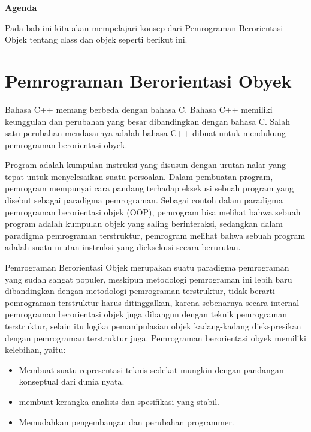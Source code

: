 \textbf{Agenda}

Pada bab ini kita akan mempelajari konsep dari Pemrograman Berorientasi Objek
tentang class dan objek seperti berikut ini.

\minitoc

\section{Pemrograman Berorientasi
Obyek}\label{pemrograman-berorientasi-obyek}

Bahasa C++ memang berbeda dengan bahasa C. Bahasa C++ memiliki
keunggulan dan perubahan yang besar dibandingkan dengan bahasa C. Salah
satu perubahan mendasarnya adalah bahasa C++ dibuat untuk mendukung
pemrograman berorientasi obyek.

Program adalah kumpulan instruksi yang disusun dengan urutan nalar yang
tepat untuk menyelesaikan suatu persoalan. Dalam pembuatan program,
pemrogram mempunyai cara pandang terhadap eksekusi sebuah program yang
disebut sebagai paradigma pemrograman. Sebagai contoh dalam paradigma
pemrograman berorientasi objek (OOP), pemrogram bisa melihat bahwa
sebuah program adalah kumpulan objek yang saling berinteraksi, sedangkan
dalam paradigma pemrograman terstruktur, pemrogram melihat bahwa sebuah
program adalah suatu urutan instruksi yang dieksekusi secara berurutan.

Pemrograman Berorientasi Objek merupakan suatu paradigma pemrograman
yang sudah sangat populer, meskipun metodologi pemrograman ini lebih
baru dibandingkan dengan metodologi pemrograman terstruktur, tidak
berarti pemrograman terstruktur harus ditinggalkan, karena sebenarnya
secara internal pemrograman berorientasi objek juga dibangun dengan
teknik pemrograman terstruktur, selain itu logika pemanipulasian objek
kadang-kadang diekspresikan dengan pemrograman terstruktur juga.
Pemrograman berorientasi obyek memiliki kelebihan, yaitu:

\begin{itemize}

\item
  Membuat suatu representasi teknis sedekat mungkin dengan pandangan
  konseptual dari dunia nyata.
\item
  membuat kerangka analisis dan spesifikasi yang stabil.
\item
  Memudahkan pengembangan dan perubahan programmer.
\end{itemize}

